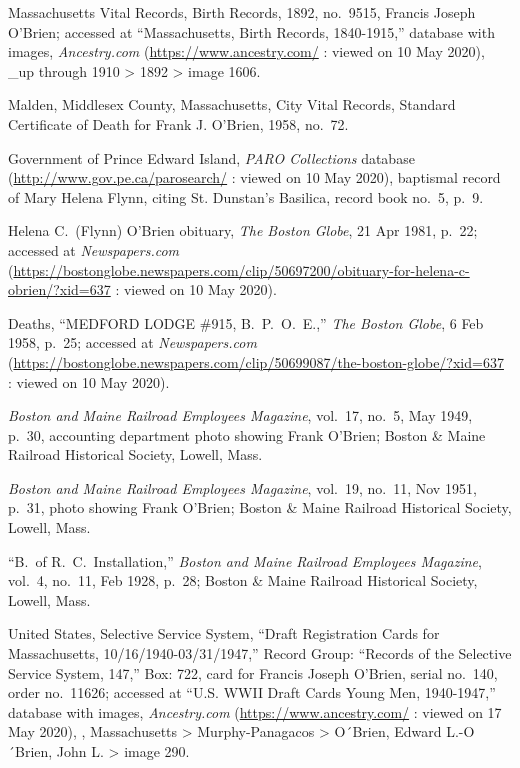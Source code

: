 \begin{thebibliography}{999}
	Massachusetts Vital Records, Birth Records, 1892, no.\ 9515, Francis Joseph O'Brien; accessed at ``Massachusetts, Birth Records, 1840-1915,'' database with images, \textit{Ancestry.com} (\url{https://www.ancestry.com/} : viewed on 10 May 2020), \_up through 1910 > 1892 > image 1606.
	
	Malden, Middlesex County, Massachusetts, City Vital Records, Standard Certificate of Death for Frank J. O'Brien, 1958, no.\ 72.
	
	Government of Prince Edward Island, \textit{PARO Collections} database (\url{http://www.gov.pe.ca/parosearch/} : viewed on 10 May 2020), baptismal record of Mary Helena Flynn, citing St. Dunstan's Basilica, record book no.\ 5, p.\ 9.
	
	Helena C.\ (Flynn) O'Brien obituary, \textit{The Boston Globe}, 21 Apr 1981, p.\ 22; accessed at \textit{Newspapers.com} (\url{https://bostonglobe.newspapers.com/clip/50697200/obituary-for-helena-c-obrien/?xid=637} : viewed on 10 May 2020).
	
	Deaths, ``MEDFORD LODGE \#915, B.\ P.\ O.\ E.,'' \textit{The Boston Globe}, 6 Feb 1958, p.\ 25; accessed at \textit{Newspapers.com} (\url{https://bostonglobe.newspapers.com/clip/50699087/the-boston-globe/?xid=637} : viewed on 10 May 2020).
	
	\textit{Boston and Maine Railroad Employees Magazine}, vol.\ 17, no.\ 5, May 1949, p.\ 30, accounting department photo showing Frank O'Brien; Boston \& Maine Railroad Historical Society, Lowell, Mass.
	
	\textit{Boston and Maine Railroad Employees Magazine}, vol.\ 19, no.\ 11, Nov 1951, p.\ 31, photo showing Frank O'Brien; Boston \& Maine Railroad Historical Society, Lowell, Mass.
	
	``B.\ of R.\ C.\ Installation,'' \textit{Boston and Maine Railroad Employees Magazine}, vol.\ 4, no.\ 11, Feb 1928, p.\ 28; Boston \& Maine Railroad Historical Society, Lowell, Mass.
	
	United States, Selective Service System, ``Draft Registration Cards for Massachusetts, 10/16/1940-03/31/1947,'' Record Group: ``Records of the Selective Service System, 147,'' Box: 722, card for Francis Joseph O'Brien, serial no.\ 140, order no.\ 11626; accessed at ``U.S. WWII Draft Cards Young Men, 1940-1947,'' database with images, \textit{Ancestry.com} (\url{https://www.ancestry.com/} : viewed on 17 May 2020), , Massachusetts > Murphy-Panagacos > O´Brien, Edward L.-O´Brien, John L. > image 290.
	

\end{thebibliography}
